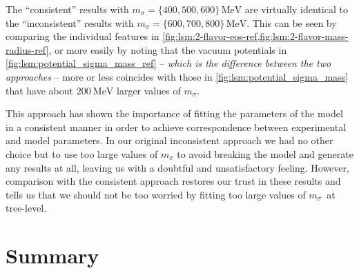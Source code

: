 The ``consistent'' results with $m_\sigma=\{400,500,600\} \, \si{\mega\electronvolt}$ are
virtually identical to the ``inconsistent'' results with $m_\sigma=\{600,700,800\} \, \si{\mega\electronvolt}$.
This can be seen by comparing the individual features in \cref{fig:lsm:2-flavor-eos-ref,fig:lsm:2-flavor-mass-radius-ref},
or more easily by noting that the vacuum potentials in \cref{fig:lsm:potential_sigma_mass_ref}
-- \emph{which is the difference between the two approaches} --
more or less coincides with those in \cref{fig:lsm:potential_sigma_mass} that have about $\SI{200}{\mega\electronvolt}$ larger values of $m_\sigma$.

This approach has shown the importance of fitting the parameters of the model in a consistent manner in order to achieve correspondence between experimental and model parameters.
In our original inconsistent approach we had no other choice but to use too large values of $m_\sigma$ to avoid breaking the model and generate any results at all,
leaving us with a doubtful and unsatisfactory feeling.
However, comparison with the consistent approach restores our trust in these results
and tells us that we should not be too worried by fitting too large values of $m_\sigma$ at tree-level.

\section{Summary}



